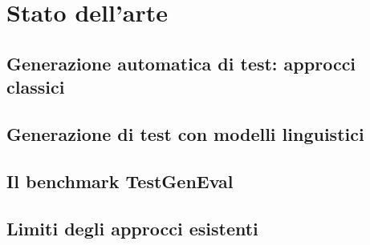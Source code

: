 \chapter{Stato dell'arte}
\label{ch:stato_arte}


\section{Generazione automatica di test: approcci classici}

\section{Generazione di test con modelli linguistici}

\section{Il benchmark TestGenEval}

\section{Limiti degli approcci esistenti}
